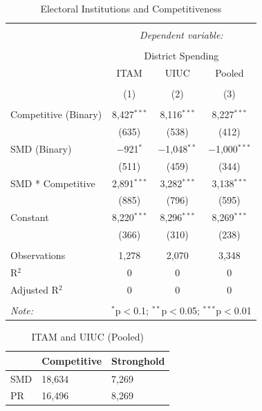 \documentclass{article}
\begin{document}
\begin{table}[!htbp] \centering 
  \caption{Electoral Institutions and Competitiveness} 
  \label{} 
\begin{tabular}{@{\extracolsep{5pt}}lccc} 
\\[-1.8ex]\hline 
\hline \\[-1.8ex] 
 & \multicolumn{3}{c}{\textit{Dependent variable:}} \\ 
\cline{2-4} 
\\[-1.8ex] & \multicolumn{3}{c}{District Spending} \\ 
 & ITAM & UIUC & Pooled \\ 
\\[-1.8ex] & (1) & (2) & (3)\\ 
\hline \\[-1.8ex] 
 Competitive (Binary) & 8,427$^{***}$ & 8,116$^{***}$ & 8,227$^{***}$ \\ 
  & (635) & (538) & (412) \\ 
  SMD (Binary) & $-$921$^{*}$ & $-$1,048$^{**}$ & $-$1,000$^{***}$ \\ 
  & (511) & (459) & (344) \\ 
  SMD * Competitive & 2,891$^{***}$ & 3,282$^{***}$ & 3,138$^{***}$ \\ 
  & (885) & (796) & (595) \\ 
  Constant & 8,220$^{***}$ & 8,296$^{***}$ & 8,269$^{***}$ \\ 
  & (366) & (310) & (238) \\ 
 \hline \\[-1.8ex] 
Observations & 1,278 & 2,070 & 3,348 \\ 
R$^{2}$ & 0 & 0 & 0 \\ 
Adjusted R$^{2}$ & 0 & 0 & 0 \\ 
\hline 
\hline \\[-1.8ex] 
\textit{Note:}  & \multicolumn{3}{r}{$^{*}$p$<$0.1; $^{**}$p$<$0.05; $^{***}$p$<$0.01} \\ 
\end{tabular} 
\end{table} 
\begin{table}[t]

\caption{\label{tab:}ITAM and UIUC (Pooled)}
\centering
\begin{tabular}{l|l|l}
\hline
  & Competitive & Stronghold\\
\hline
SMD & 18,634 & 7,269\\
\hline
PR & 16,496 & 8,269\\
\hline
\end{tabular}
\end{table}
\end{document}
